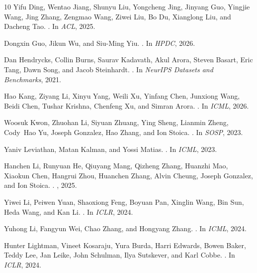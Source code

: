 \begin{thebibliography}{10}
Yifu Ding, Wentao Jiang, Shunyu Liu, Yongcheng Jing, Jinyang Guo, Yingjie
  Wang, Jing Zhang, Zengmao Wang, Ziwei Liu, Bo Du, Xianglong Liu, and
  Dacheng Tao.
.
\newblock In {\em ACL}, 2025.

Dongxin Guo, Jikun Wu, and Siu-Ming Yiu.
.
\newblock In {\em HPDC}, 2026.

Dan Hendrycks, Collin Burns, Saurav Kadavath, Akul Arora, Steven Basart, Eric
  Tang, Dawn Song, and Jacob Steinhardt.
.
\newblock In {\em NeurIPS Datasets and Benchmarks}, 2021.

Hao Kang, Ziyang Li, Xinyu Yang, Weili Xu, Yinfang Chen, Junxiong Wang, Beidi
  Chen, Tushar Krishna, Chenfeng Xu, and Simran Arora.
.
\newblock In {\em ICML}, 2026.

Woosuk Kwon, Zhuohan Li, Siyuan Zhuang, Ying Sheng, Lianmin Zheng, Cody~Hao Yu,
  Joseph Gonzalez, Hao Zhang, and Ion Stoica.
.
\newblock In {\em SOSP}, 2023.

Yaniv Leviathan, Matan Kalman, and Yossi Matias.
.
\newblock In {\em ICML}, 2023.

Hanchen Li, Runyuan He, Qiuyang Mang, Qizheng Zhang, Huanzhi Mao, Xiaokun Chen,
  Hangrui Zhou, Huanchen Zhang, Alvin Cheung, Joseph Gonzalez, and Ion Stoica.
.
, 2025.

Yiwei Li, Peiwen Yuan, Shaoxiong Feng, Boyuan Pan, Xinglin Wang, Bin Sun,
  Heda Wang, and Kan Li.
.
\newblock In {\em ICLR}, 2024.

Yuhong Li, Fangyun Wei, Chao Zhang, and Hongyang Zhang.
.
\newblock In {\em ICML}, 2024.

Hunter Lightman, Vineet Kosaraju, Yura Burda, Harri Edwards, Bowen Baker, Teddy
  Lee, Jan Leike, John Schulman, Ilya Sutskever, and Karl Cobbe.
.
\newblock In {\em ICLR}, 2024.


\end{thebibliography}
